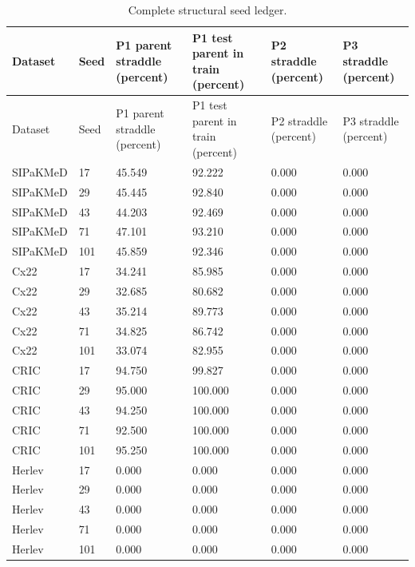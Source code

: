 \begin{longtable}{p{2.0cm}p{1.0cm}p{2.5cm}p{2.8cm}p{2.5cm}p{2.5cm}}
\caption{Complete structural seed ledger.}\label{tab:structural-seed-ledger}\\
\toprule
Dataset & Seed & P1 parent straddle (percent) & P1 test parent in train (percent) & P2 straddle (percent) & P3 straddle (percent) \\
\midrule
\endfirsthead
\toprule
Dataset & Seed & P1 parent straddle (percent) & P1 test parent in train (percent) & P2 straddle (percent) & P3 straddle (percent) \\
\midrule
\endhead
\bottomrule
\endfoot
SIPaKMeD & 17 & 45.549 & 92.222 & 0.000 & 0.000 \\ 
SIPaKMeD & 29 & 45.445 & 92.840 & 0.000 & 0.000 \\ 
SIPaKMeD & 43 & 44.203 & 92.469 & 0.000 & 0.000 \\ 
SIPaKMeD & 71 & 47.101 & 93.210 & 0.000 & 0.000 \\ 
SIPaKMeD & 101 & 45.859 & 92.346 & 0.000 & 0.000 \\ 
Cx22 & 17 & 34.241 & 85.985 & 0.000 & 0.000 \\ 
Cx22 & 29 & 32.685 & 80.682 & 0.000 & 0.000 \\ 
Cx22 & 43 & 35.214 & 89.773 & 0.000 & 0.000 \\ 
Cx22 & 71 & 34.825 & 86.742 & 0.000 & 0.000 \\ 
Cx22 & 101 & 33.074 & 82.955 & 0.000 & 0.000 \\ 
CRIC & 17 & 94.750 & 99.827 & 0.000 & 0.000 \\ 
CRIC & 29 & 95.000 & 100.000 & 0.000 & 0.000 \\ 
CRIC & 43 & 94.250 & 100.000 & 0.000 & 0.000 \\ 
CRIC & 71 & 92.500 & 100.000 & 0.000 & 0.000 \\ 
CRIC & 101 & 95.250 & 100.000 & 0.000 & 0.000 \\ 
Herlev & 17 & 0.000 & 0.000 & 0.000 & 0.000 \\ 
Herlev & 29 & 0.000 & 0.000 & 0.000 & 0.000 \\ 
Herlev & 43 & 0.000 & 0.000 & 0.000 & 0.000 \\ 
Herlev & 71 & 0.000 & 0.000 & 0.000 & 0.000 \\ 
Herlev & 101 & 0.000 & 0.000 & 0.000 & 0.000 \\ 
\end{longtable}
